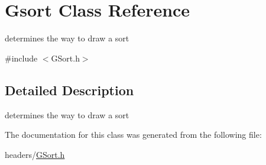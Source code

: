 \hypertarget{class_gsort}{\section{\-Gsort \-Class \-Reference}
\label{class_gsort}
}


determines the way to draw a sort  




{\ttfamily \#include $<$\-G\-Sort.\-h$>$}



\subsection{\-Detailed \-Description}
determines the way to draw a sort 

\-The documentation for this class was generated from the following file\-:\begin{DoxyCompactItemize}
\item 
headers/\hyperlink{_g_sort_8h}{\-G\-Sort.\-h}\end{DoxyCompactItemize}
